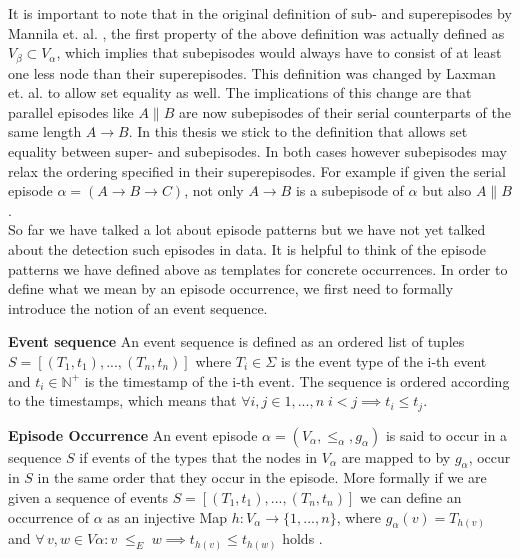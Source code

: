It is important to note that in the original definition of sub- and superepisodes by Mannila et. al. \cite{mannila1995discovering}, the first property of the above definition was actually defined as $V_\beta \subset V_\alpha$, which implies that subepisodes would always have to consist of at least one less node than their superepisodes. This definition was changed by Laxman et. al. \cite{laxman2007fast} to allow set equality as well. The implications of this change are that parallel episodes like $A \| B$ are now subepisodes of their serial counterparts of the same length $A \rightarrow B$. In this thesis we stick to the definition that allows set equality between super- and subepisodes. In both cases however subepisodes may relax the ordering specified in their superepisodes. For example if given the serial episode $\alpha =( A \rightarrow B \rightarrow C )$, not only $A \rightarrow B$ is a subepisode of $\alpha$ but also $A \| B$. \\
So far we have talked a lot about episode patterns but we have not yet talked about the detection such episodes in data. It is helpful to think of the episode patterns we have defined above as templates for concrete occurrences. In order to define what we mean by an episode occurrence, we first need to formally introduce the notion of an event sequence.

\begin{mydef}
\textbf{Event sequence} An event sequence is defined as an ordered list of tuples $S = [ (T_1,t_1),..., (T_n,t_n) ] $ where $T_i \in \Sigma$ is the event type of the i-th event and $t_i \in \mathbb{N}^+$ is the timestamp of the i-th event. The sequence is ordered according to the timestamps, which means that $\forall i,j \in {1,...,n} \; i<j \implies t_i \leq t_j$. %
\end{mydef}

\begin{mydef}
\label{def_episodeOccurrence}
\textbf{Episode Occurrence} An event episode $\alpha = (V_\alpha,{\leq}_{\alpha},g_\alpha)$ is said to occur in a sequence $S$ if events of the types that the nodes in $V_\alpha$ are mapped to by $g_\alpha$, occur in $S$ in the same order that they occur in the episode. More formally if we are given a sequence of events $S=[(T_1,t_1),...,(T_n,t_n)]$ we can define an occurrence of $\alpha$ as an injective Map $h:V_\alpha \rightarrow \{1,...,n\}$, where $g_\alpha (v) = T_{h(v)}$ and $\forall \, v,w \in V\alpha : v \;{\leq}_{E}\; w \implies t_{h(v)} \le t_{h(w)}$ holds \cite{mannila1995discovering}.
\end{mydef}

